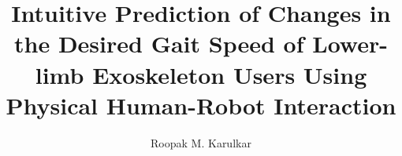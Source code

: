 




	
	\frontmatter             %
	
	\title{ Intuitive Prediction of Changes in the Desired Gait Speed of Lower-limb Exoskeleton Users Using Physical Human-Robot Interaction}  %
	
	\author{ Roopak M. Karulkar }      %
	
	\maketitle               %
	
	 \makecopyright        %
	
	
	 
	
